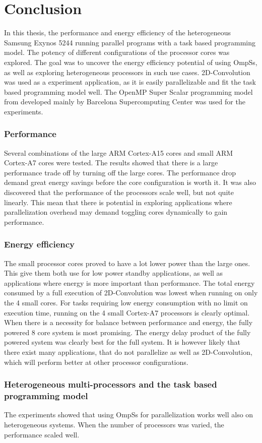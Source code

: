 \chapter[Conclusion]{Conclusion}
In this thesis, the performance and energy efficiency of the heterogeneous Samsung Exynos 5244 running parallel programs with a task based programming model.
The potency of different configurations of the processor cores was explored.
The goal was to uncover the energy efficiency potential of using OmpSs, as well as exploring heterogeneous processors in such use cases.
2D-Convolution was used as a experiment application, as it is easily parallelizable and fit the task based programming model well.
The OpenMP Super Scalar programming model from developed mainly by Barcelona Supercomputing Center was used for the experiments.

\subsection{Performance}
Several combinations of the large ARM Cortex-A15 cores and small ARM Cortex-A7 cores were tested.
The results showed that there is a large performance trade off by turning off the large cores.
The performance drop demand great energy savings before the core configuration is worth it.
It was also discovered that the performance of the processors scale well, but not quite linearly.
This mean that there is potential in exploring applications where parallelization overhead may demand toggling cores dynamically to gain performance.

\subsection{Energy efficiency}
The small processor cores proved to have a lot lower power than the large ones.
This give them both use for low power standby applications, as well as applications where energy is more important than performance.
The total energy consumed by a full execution of 2D-Convolution was lowest when running on only the 4 small cores.
For tasks requiring low energy consumption with no limit on execution time, running on the 4 small Cortex-A7 processors is clearly optimal.
When there is a necessity for balance between performance and energy, the fully powered 8 core system is most promising.
The energy delay product of the fully powered system was clearly best for the full system.
It is however likely that there exist many applications, that do not parallelize as well as 2D-Convolution, which will perform better at other processor configurations.

\subsection{Heterogeneous multi-processors and the task based programming model}
The experiments showed that using OmpSs for parallelization works well also on heterogeneous systems.
When the number of processors was varied, the performance scaled well.
